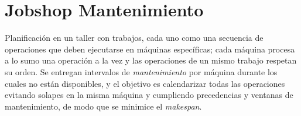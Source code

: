
\section{Jobshop Mantenimiento}\label{sec:01-jobshop_tardanza}

Planificación en un taller con trabajos, cada uno como una secuencia de operaciones que deben ejecutarse en máquinas específicas; cada máquina procesa a lo sumo una operación a la vez y las operaciones de un mismo trabajo respetan su orden. Se entregan intervalos de \emph{mantenimiento} por máquina durante los cuales no están disponibles, y el objetivo es calendarizar todas las operaciones evitando solapes en la misma máquina y cumpliendo precedencias y ventanas de mantenimiento, de modo que se minimice el \emph{makespan}.
